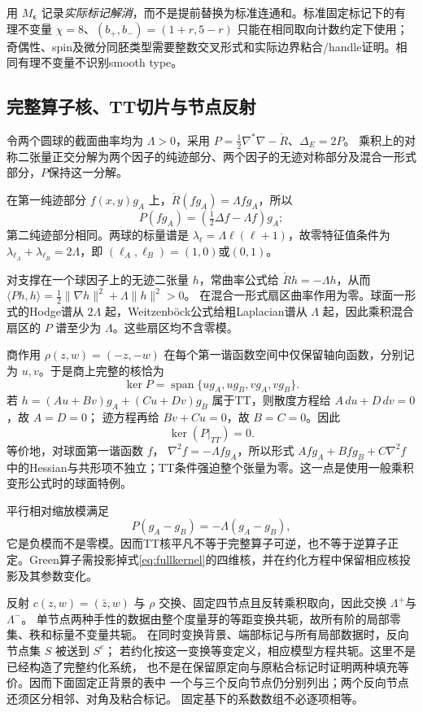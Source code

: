 \documentclass[UTF8,a4paper,11pt,fontset=fandol]{ctexart}
\numberwithin{equation}{section}
\theoremstyle{definition}
\begin{document}
用 $M_{\boldsymbol\epsilon}$ 记录\emph{实际标记解消}，而不是提前替换为标准连通和。标准固定标记下的有理不变量 $\chi=8$、$(b_+,b_-)=(1+r,5-r)$ 只能在相同取向计数约定下使用；奇偶性、spin及微分同胚类型需要整数交叉形式和实际边界粘合/handle证明。相同有理不变量不识别smooth type。

\subsection{完整算子核、TT切片与节点反射}\label{sec:fullkernel}
令两个圆球的截面曲率均为 $\Lambda>0$，采用
$P=\frac12\nabla^*\nabla-\mathring R$、$\Delta_E=2P$。
乘积上的对称二张量正交分解为两个因子的纯迹部分、两个因子的无迹对称部分及混合一形式部分，$P$保持这一分解。

在第一纯迹部分 $f(x,y)g_A$ 上，$\mathring R(fg_A)=\Lambda fg_A$，所以
\[
P(fg_A)=\left(\tfrac12\Delta f-\Lambda f\right)g_A;
\]
第二纯迹部分相同。两球的标量谱是
$\lambda_\ell=\Lambda\ell(\ell+1)$，故零特征值条件为
$\lambda_{\ell_A}+\lambda_{\ell_B}=2\Lambda$，即
$(\ell_A,\ell_B)=(1,0)$或$(0,1)$。

对支撑在一个球因子上的无迹二张量 $h$，常曲率公式给
$\mathring Rh=-\Lambda h$，从而
$\langle Ph,h\rangle=\frac12\|\nabla h\|^2+\Lambda\|h\|^2>0$。
在混合一形式扇区曲率作用为零。球面一形式的Hodge谱从 $2\Lambda$ 起，Weitzenböck公式给粗Laplacian谱从 $\Lambda$ 起，因此乘积混合扇区的 $P$ 谱至少为 $\Lambda$。这些扇区均不含零模。

商作用 $\rho(z,w)=(-z,-w)$ 在每个第一谐函数空间中仅保留轴向函数，分别记为 $u,v$。于是商上完整的核恰为
\begin{equation}\label{eq:fullkernel}
\ker P=\operatorname{span}\{ug_A,ug_B,vg_A,vg_B\}.
\end{equation}
若
$h=(Au+Bv)g_A+(Cu+Dv)g_B$
属于TT，则散度方程给 $A\,du+D\,dv=0$，故 $A=D=0$；
迹方程再给 $Bv+Cu=0$，故 $B=C=0$。因此
\begin{equation}\label{eq:ttkernel}
\ker(P|_{TT})=0.
\end{equation}
等价地，对球面第一谐函数 $f$，
$\nabla^2f=-\Lambda fg_A$，所以形式
$Afg_A+Bfg_B+C\nabla^2f$
中的Hessian与共形项不独立；TT条件强迫整个张量为零。这一点是使用一般乘积变形公式\cite{Kroncke}时的球面特例。

平行相对缩放模满足
\[
P(g_A-g_B)=-\Lambda(g_A-g_B),
\]
它是负模而不是零模。因而TT核平凡不等于完整算子可逆，也不等于逆算子正定。Green算子需投影掉式\eqref{eq:fullkernel}的四维核，并在约化方程中保留相应核投影及其参数变化。

反射 $c(z,w)=(\bar z,w)$ 与 $\rho$ 交换、固定四节点且反转乘积取向，因此交换 $\Lambda^+$与$\Lambda^-$。
单节点两种手性的数据由整个度量芽的等距变换共轭，故所有阶的局部零集、秩和标量不变量共轭。
在同时变换背景、端部标记与所有局部数据时，反向节点集 $S$ 被送到 $S^c$；
若约化按这一变换等变定义，相应模型方程共轭。这里不是已经构造了完整约化系统，
也不是在保留原定向与原粘合标记时证明两种填充等价。因而下面固定正背景的表中
一个与三个反向节点仍分别列出；两个反向节点还须区分相邻、对角及粘合标记。
固定基下的系数数组不必逐项相等。
\end{document}
